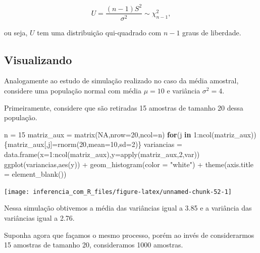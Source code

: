\documentclass[
]{book}
\newenvironment{Shaded}{\begin{snugshade}}{\end{snugshade}}
\newcommand{\AttributeTok}[1]{\textcolor[rgb]{0.77,0.63,0.00}{#1}}
\newcommand{\ConstantTok}[1]{\textcolor[rgb]{0.00,0.00,0.00}{#1}}
\newcommand{\ControlFlowTok}[1]{\textcolor[rgb]{0.13,0.29,0.53}{\textbf{#1}}}
\newcommand{\DecValTok}[1]{\textcolor[rgb]{0.00,0.00,0.81}{#1}}
\newcommand{\FunctionTok}[1]{\textcolor[rgb]{0.00,0.00,0.00}{#1}}
\newcommand{\NormalTok}[1]{#1}
\newcommand{\OtherTok}[1]{\textcolor[rgb]{0.56,0.35,0.01}{#1}}
\newcommand{\SpecialCharTok}[1]{\textcolor[rgb]{0.00,0.00,0.00}{#1}}
\newcommand{\StringTok}[1]{\textcolor[rgb]{0.31,0.60,0.02}{#1}}
\begin{document}
\[U=\frac{(n-1)S^2}{\sigma^2}\sim \chi^2_{n-1},\]

ou seja, \(U\) tem uma distribuição qui-quadrado com \(n-1\) graus de liberdade.

\hypertarget{visualizando-2}{%
\subsection{Visualizando}\label{visualizando-2}}

Analogamente ao estudo de simulação realizado no caso da média amostral, considere uma população normal com média \(\mu=10\) e variância \(\sigma^2=4\).

Primeiramente, considere que são retiradas 15 amostras de tamanho 20 dessa população.

\begin{Shaded}
\begin{Highlighting}[]
\NormalTok{n }\OtherTok{=} \DecValTok{15}
\NormalTok{matriz\_aux }\OtherTok{=} \FunctionTok{matrix}\NormalTok{(}\ConstantTok{NA}\NormalTok{,}\AttributeTok{nrow=}\DecValTok{20}\NormalTok{,}\AttributeTok{ncol=}\NormalTok{n)}
\ControlFlowTok{for}\NormalTok{(j }\ControlFlowTok{in} \DecValTok{1}\SpecialCharTok{:}\FunctionTok{ncol}\NormalTok{(matriz\_aux))\{matriz\_aux[,j]}\OtherTok{=}\FunctionTok{rnorm}\NormalTok{(}\DecValTok{20}\NormalTok{,}\AttributeTok{mean=}\DecValTok{10}\NormalTok{,}\AttributeTok{sd=}\DecValTok{2}\NormalTok{)\}}
\NormalTok{variancias }\OtherTok{=} \FunctionTok{data.frame}\NormalTok{(}\AttributeTok{x=}\DecValTok{1}\SpecialCharTok{:}\FunctionTok{ncol}\NormalTok{(matriz\_aux),}\AttributeTok{y=}\FunctionTok{apply}\NormalTok{(matriz\_aux,}\DecValTok{2}\NormalTok{,var))}
\FunctionTok{ggplot}\NormalTok{(variancias,}\FunctionTok{aes}\NormalTok{(y)) }\SpecialCharTok{+}
  \FunctionTok{geom\_histogram}\NormalTok{(}\AttributeTok{color =} \StringTok{"white"}\NormalTok{) }\SpecialCharTok{+}
  \FunctionTok{theme}\NormalTok{(}\AttributeTok{axis.title =} \FunctionTok{element\_blank}\NormalTok{())}
\end{Highlighting}
\end{Shaded}

\begin{center}\texttt{[image: inferencia\_com\_R\_files/figure-latex/unnamed-chunk-52-1]} \end{center}

Nessa simulação obtivemos a média das variâncias igual a 3.85 e a variância das variâncias igual a 2.76.

Suponha agora que façamos o mesmo processo, porém ao invés de considerarmos 15 amostras de tamanho 20, consideramos 1000 amostras.
\end{document}
